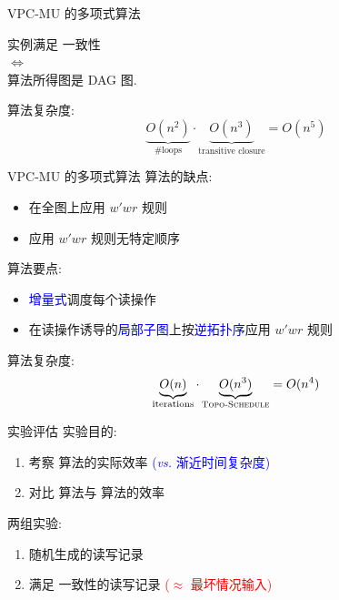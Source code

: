 \begin{frame}{VPC-MU 的多项式算法 \rwclosure{}}
  \begin{ctheorem}
	\begin{center}
	   实例满足 \PRAM{} 一致性\\
		$\iff$\\
	  \rwclosure{} 算法所得图是 DAG 图.
	\end{center}
  \end{ctheorem}

  \pause
  \vspace{0.60cm}

  \rwclosure{} 算法复杂度: 
  \[
    \underbrace{O(n^2)}_{\textrm{\#loops}} \cdot
	\underbrace{O(n^3)}_{\textrm{transitive closure}}  = O(n^5)
  \]
\end{frame}
\begin{frame}{VPC-MU 的多项式算法 \readcentric{}}
  \rwclosure{} 算法的缺点:
  \begin{itemize}
	\item 在全图上应用 $w'wr$ 规则
	\item 应用 $w'wr$ 规则无特定顺序
  \end{itemize}

  \pause
  \vspace{0.50cm}

  \readcentric{} 算法要点:
  \begin{itemize}
	\item \textcolor{blue}{增量式}调度每个读操作
	\item 在读操作诱导的\textcolor{blue}{局部子图}上按\textcolor{blue}{逆拓扑序}应用 $w'wr$ 规则
  \end{itemize}

  \pause
  \vspace{0.60cm}
  \rwclosure{} 算法复杂度: 
  \[
    \underbrace{O(n)}_{\textrm{iterations}} \cdot
	\underbrace{O(n^3)}_{\textsc{Topo-Schedule}} = O(n^4)
  \]
\end{frame}
\begin{frame}{实验评估}
  实验目的:
  \begin{enumerate}
	\item 考察 \readcentric{} 算法的实际效率 
	  \textcolor{blue}{\small ({\it vs.} 渐近时间复杂度)}
	\item 对比 \readcentric{} 算法与 \rwclosure{} 算法的效率
  \end{enumerate}

  \pause
  \vspace{0.50cm}

  两组实验:
  \begin{enumerate}
	\item 随机生成的读写记录
	\item 满足 \PRAM{} 一致性的读写记录 \textcolor{red}{\small ($\approx$ 最坏情况输入)}
  \end{enumerate}
\end{frame}
